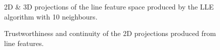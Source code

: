 \begin{figure}[H]
	\centering
	\caption{2D \& 3D projections of the line feature space produced by the LLE algorithm with 10 neighbours.}\label{fig:line_LLE_mapping}
\end{figure}
\clearpage

\clearpage
\begin{figure}[H]
	\centering
	\caption{Trustworthiness and continuity of the 2D projections produced from line features.}\label{fig:TC_2d_lines}
\end{figure}

